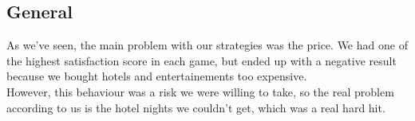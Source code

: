 \subsection{General}
As we've seen, the main problem with our strategies was the price. We had one of the highest satisfaction score in each game, but ended up with a negative result because we bought hotels and entertainements too expensive.\\
However, this behaviour was a risk we were willing to take, so the real problem according to us is the hotel nights we couldn't get, which was a real hard hit.
